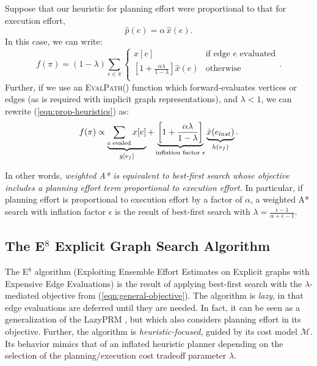 Suppose that our heuristic for planning effort
were proportional to that for execution effort,
\begin{equation}
   \hat{p}(e) = \alpha \, \hat{x}(e) .
\end{equation}
%
In this case, we can write:
\begin{equation}
   f(\pi) = (1-\lambda) \sum_{e \in \pi} \left\{
   \begin{array}{cl}
      x[e] & \mbox{if edge } e \mbox{ evaluated}  \\
      \left[ 1 + \frac{\alpha\lambda}{1 - \lambda} \right] \hat{x}(e) & \mbox{otherwise} \\
   \end{array}
   \right.
   .
   \label{eqn:prop-heuristics}
\end{equation}
Further,
if we use an \textsc{EvalPath}() function which forward-evaluates
vertices or edges
(as is required with implicit graph representations),
and $\lambda < 1$,
we can rewrite (\ref{eqn:prop-heuristics}) as:
\begin{equation}
   f(\pi) \propto
   \underbrace{\sum_{e \; \mbox{\scriptsize evaled}} x[e]}_{g[v_f]}
   +
   \underbrace{\left[ 1 + \frac{\alpha \lambda}{1-\lambda} \right]}_{
      \mbox{\scriptsize inflation factor } \epsilon}
   \underbrace{\hat{x}(e_{last})}_{h(v_f)}
   .
\end{equation}

In other words,
\emph{weighted A* is equivalent to
   best-first search whose objective
   includes a planning effort term
   proportional to execution effort.}
In particular, if planning effort is proportional to execution
effort by a factor of $\alpha$,
a weighted A* search with inflation factor $\epsilon$
is the result of best-first search with
$\lambda = \frac{\epsilon-1}{\alpha+\epsilon-1}$.

\subsection{The E$^8$ Explicit Graph Search Algorithm}
\label{sec:e8-planner}

The E$^8$ algorithm
(Exploiting Ensemble Effort Estimates
on Explicit graphs with Expensive Edge Evaluations)
is the result of applying
best-first search with the $\lambda$-mediated objective
from (\ref{eqn:general-objective}).
The algorithm is \emph{lazy},
in that edge evaluations are deferred until they are needed.
In fact, it can be seen as a generalization of the
LazyPRM \citep{bohlin2000lazyprm},
but which also considers planning effort in its objective.
Further,
the algorithm is \emph{heuristic-focused},
guided by its cost model $\mathcal{M}$.
Its behavior mimics that of an inflated heuristic planner
depending on the selection of the planning/execution cost
tradeoff parameter $\lambda$.

